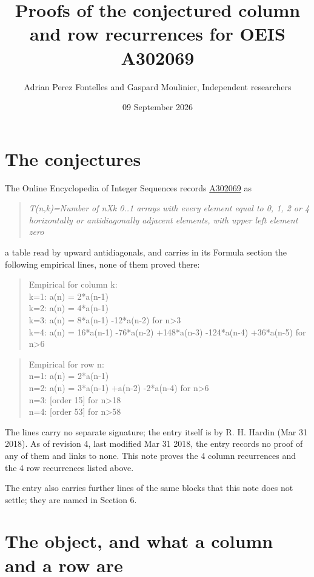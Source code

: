 \documentclass[11pt]{article}
\title{Proofs of the conjectured column and row recurrences for OEIS A302069}
\author{Adrian Perez Fontelles and Gaspard Moulinier, Independent researchers}
\date{09 September 2026}
\theoremstyle{definition}
\begin{document}
\maketitle
\section{The conjectures}

The Online Encyclopedia of Integer Sequences records \href{https://oeis.org/A302069}{A302069} as

\begin{quote}\itshape T(n,k)=Number of nXk 0..1 arrays with every element equal to 0, 1, 2 or 4 horizontally or antidiagonally adjacent elements, with upper left element zero\end{quote}

a table read by upward antidiagonals, and carries in its Formula section the following empirical lines, none of them proved there:

\begin{quote}\ttfamily Empirical for column k:\\
k=1: a(n) = 2*a(n-1)\\k=2: a(n) = 4*a(n-1)\\k=3: a(n) = 8*a(n-1) -12*a(n-2) for n>3\\k=4: a(n) = 16*a(n-1) -76*a(n-2) +148*a(n-3) -124*a(n-4) +36*a(n-5) for n>6\end{quote}

\begin{quote}\ttfamily Empirical for row n:\\
n=1: a(n) = 2*a(n-1)\\n=2: a(n) = 3*a(n-1) +a(n-2) -2*a(n-4) for n>6\\n=3: [order 15] for n>18\\n=4: [order 53] for n>58\end{quote}

The lines carry no separate signature; the entry itself is by R. H. Hardin (Mar 31 2018). As of revision 4, last modified Mar 31 2018, the entry records no proof of any of them and links to none. This note proves the 4 column recurrences and the 4 row recurrences listed above.

The entry also carries further lines of the same blocks that this note does not settle; they are named in Section 6.

\section{The object, and what a column and a row are}
\end{document}
